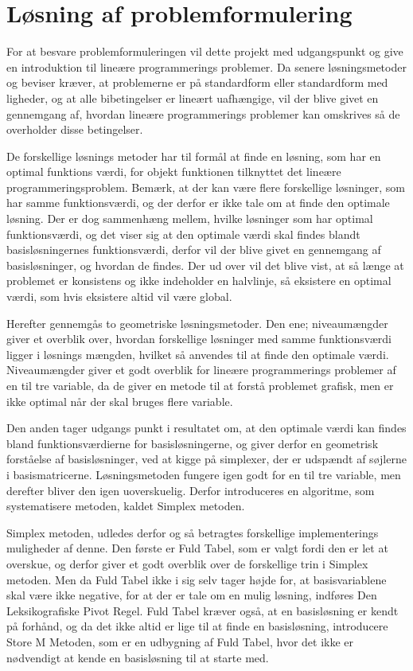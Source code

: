 \section{Løsning af problemformulering}
For at besvare problemformuleringen vil dette projekt med udgangspunkt \citep{bert} og \citep{lay} give en introduktion til lineære programmerings problemer. 
Da senere løsningsmetoder og beviser kræver, at problemerne er på standardform eller standardform med ligheder, og at alle bibetingelser er lineært uafhængige, vil der blive givet en gennemgang af, hvordan lineære programmerings problemer kan omskrives så de overholder disse betingelser.

De forskellige løsnings metoder har til formål at finde en løsning, som har en optimal funktions værdi, for objekt funktionen tilknyttet det lineære programmeringsproblem.
Bemærk, at der kan være flere forskellige løsninger, som har samme funktionsværdi, og der derfor er ikke tale om at finde den optimale løsning. 
Der er dog sammenhæng mellem, hvilke løsninger som har optimal funktionsværdi, og det viser sig at den optimale værdi skal findes blandt basisløsningernes funktionsværdi, derfor vil der blive givet en gennemgang af basisløsninger, og hvordan de findes.
Der ud over vil det blive vist, at så længe at problemet er konsistens og ikke indeholder en halvlinje, så eksistere en optimal værdi, som hvis eksistere altid vil være global.

Herefter gennemgås to geometriske løsningsmetoder.
Den ene; niveaumængder giver et overblik over, hvordan forskellige løsninger med samme funktionsværdi ligger i løsnings mængden, hvilket så anvendes til at finde den optimale værdi. 
Niveaumængder giver et godt overblik for lineære programmerings problemer af en til tre variable, da de giver en metode til at forstå problemet grafisk, men er ikke optimal når der skal bruges flere variable.

Den anden tager udgangs punkt i resultatet om, at den optimale værdi kan findes bland funktionsværdierne for basisløsningerne, og giver derfor en geometrisk forståelse af basisløsninger, ved at kigge på simplexer, der er udspændt af søjlerne i basismatricerne.
Løsningsmetoden fungere igen godt for en til tre variable, men derefter bliver den igen uoverskuelig.
Derfor introduceres en algoritme, som systematisere metoden, kaldet Simplex metoden.

Simplex metoden, udledes derfor og så betragtes forskellige implementerings muligheder af denne.
Den første er Fuld Tabel, som er valgt fordi den er let at overskue, og derfor giver et godt overblik over de forskellige trin i Simplex metoden.
Men da Fuld Tabel ikke i sig selv tager højde for, at basisvariablene skal være ikke negative, for at der er tale om en mulig løsning, indføres Den Leksikografiske Pivot Regel.
Fuld Tabel kræver også, at en basisløsning er kendt på forhånd, og da det ikke altid er lige til at finde en basisløsning, introducere Store M Metoden, som er en udbygning af Fuld Tabel, hvor det ikke er nødvendigt at kende en basisløsning til at starte med.

